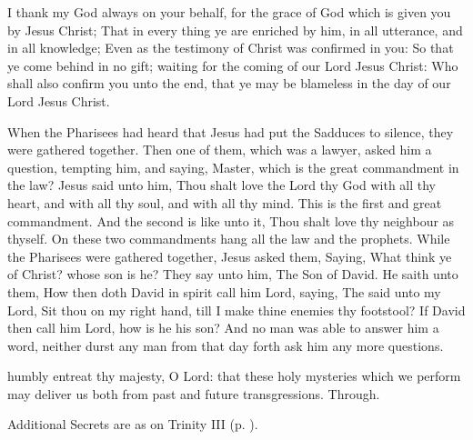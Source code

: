  I thank my God always on your behalf, for the grace of God which is given you by Jesus Christ; That in every thing ye are enriched by him, in all utterance, and in all knowledge; Even as the testimony of Christ was confirmed in you: So that ye come behind in no gift; waiting for the coming of our Lord Jesus Christ: Who shall also confirm you unto the end, that ye may be blameless in the day of our Lord Jesus Christ.


 When the Pharisees had heard that Jesus had put the Sadduces to silence, they were gathered together. Then one of them, which was a lawyer, asked him a question, tempting him, and saying, Master, which is the great commandment in the law? Jesus said unto him, Thou shalt love the Lord thy God with all thy heart, and with all thy soul, and with all thy mind. This is the first and great commandment. And the second is like unto it, Thou shalt love thy neighbour as thyself. On these two commandments hang all the law and the prophets. While the Pharisees were gathered together, Jesus asked them, Saying, What think ye of Christ? whose son is he? They say unto him, The Son of David. He saith unto them, How then doth David in spirit call him Lord, saying, The  said unto my Lord, Sit thou on my right hand, till I make thine enemies thy footstool? If David then call him Lord, how is he his son? And no man was able to answer him a word, neither durst any man from that day forth ask him any more questions.


\secret
{} humbly entreat thy majesty, O Lord: that these holy mysteries which we perform may deliver us both from past and future transgressions. Through.
\begin{rubric}
    Additional Secrets are as on Trinity III (p. \pageref{TrinityIII}).
\end{rubric}

